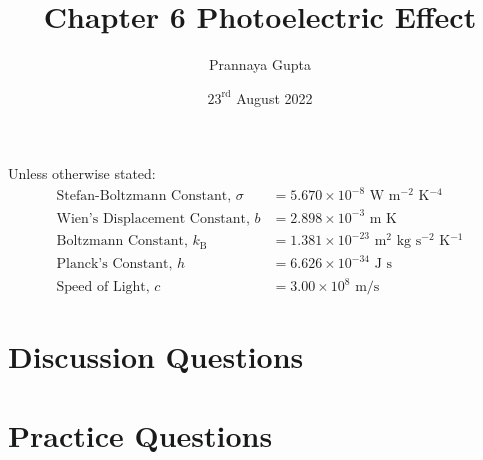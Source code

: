 \documentclass[a4paper, 12pt, addpoints]{exam}
\title{Chapter 6 \textbf{Photoelectric Effect}}
\author{Prannaya Gupta}
\date{$23^{\text{rd}}$ August 2022}
\begin{document}
\maketitle


\begin{tcolorbox}
Unless otherwise stated:
\begin{align*}
\text{Stefan-Boltzmann Constant, }\sigma &= 5.670 \times 10^{-8}\text{ W m${}^{-2}$ K${}^{-4}$} \\
\text{Wien's Displacement Constant, }b &= 2.898 \times 10^{-3} \text{ m K} \\
\text{Boltzmann Constant, }k_\text{B} &= 1.381 \times 10^{-23}\text{ m${}^2$ kg s${}^{-2}$ K${}^{-1}$} \\
\text{Planck's Constant, }h &= 6.626 \times 10^{-34}\text{ J s} \\
\text{Speed of Light, }c &= 3.00 \times 10^8 \text{ m/s}
\end{align*}
\end{tcolorbox}
\newpage
\section{Discussion Questions}
\newpage

\section{Practice Questions}

\begin{questions}
\question 

\end{questions}
\end{document}
